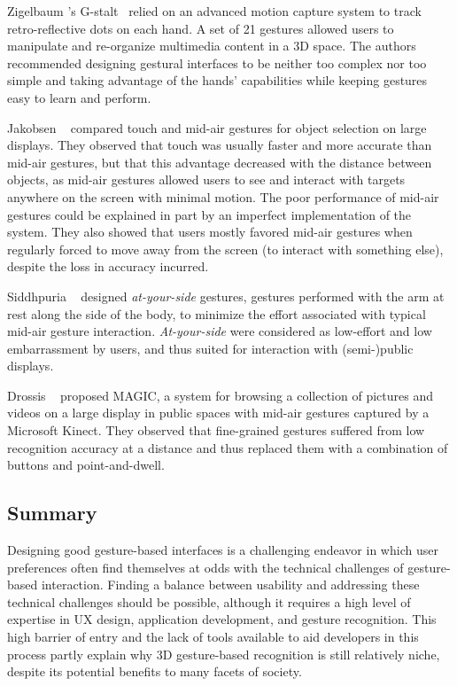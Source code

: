 Zigelbaum \etal's G-stalt~\cite{Zigelbaum:2010} relied on an advanced motion capture system to track retro-reflective dots on each hand. A set of 21 gestures allowed users to manipulate and re-organize multimedia content in a 3D space. The authors recommended designing gestural interfaces to be neither too complex nor too simple and taking advantage of the hands' capabilities while keeping gestures easy to learn and perform.

Jakobsen \etal~\cite{Jakobsen:2015} compared touch and mid-air gestures for object selection on large displays. They observed that touch was usually faster and more accurate than mid-air gestures, but that this advantage decreased with the distance between objects, as mid-air gestures allowed users to see and interact with targets anywhere on the screen with minimal motion. The poor performance of mid-air gestures could be explained in part by an imperfect implementation of the system. They also showed that users mostly favored mid-air gestures when regularly forced to move away from the screen (\eg to interact with something else), despite the loss in accuracy incurred.

Siddhpuria \etal~\cite{Siddhpuria:2017} designed \textit{at-your-side} gestures, \ie gestures performed with the arm at rest along the side of the body, to minimize the effort associated with typical mid-air gesture interaction. \textit{At-your-side} were considered as low-effort and low embarrassment by users, and thus suited for interaction with (semi-)public displays.

Drossis \etal~\cite{Drossis:2013} proposed MAGIC, a system for browsing a collection of pictures and videos on a large display in public spaces with mid-air gestures captured by a Microsoft Kinect. They observed that fine-grained gestures suffered from low recognition accuracy at a distance and thus replaced them with a combination of buttons and point-and-dwell.

\subsection{Summary} \label{sec:state_of_the_art:overview:summary}
Designing good gesture-based interfaces is a challenging endeavor in which user preferences often find themselves at odds with the technical challenges of gesture-based interaction. Finding a balance between usability and addressing these technical challenges should be possible, although it requires a high level of expertise in UX design, application development, and gesture recognition. This high barrier of entry and the lack of tools available to aid developers in this process partly explain why 3D gesture-based recognition is still relatively niche, despite its potential benefits to many facets of society.


